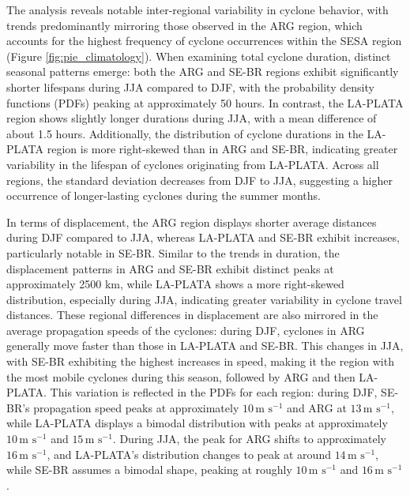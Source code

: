 The analysis reveals notable inter-regional variability in cyclone behavior, with trends predominantly mirroring those observed in the ARG region, which accounts for the highest frequency of cyclone occurrences within the SESA region (Figure \ref{fig:pie_climatology}). When examining total cyclone duration, distinct seasonal patterns emerge: both the ARG and SE-BR regions exhibit significantly shorter lifespans during JJA compared to DJF, with the probability density functions (PDFs) peaking at approximately 50 hours. In contrast, the LA-PLATA region shows slightly longer durations during JJA, with a mean difference of about 1.5 hours. Additionally, the distribution of cyclone durations in the LA-PLATA region is more right-skewed than in ARG and SE-BR, indicating greater variability in the lifespan of cyclones originating from LA-PLATA. Across all regions, the standard deviation decreases from DJF to JJA, suggesting a higher occurrence of longer-lasting cyclones during the summer months.

In terms of displacement, the ARG region displays shorter average distances during DJF compared to JJA, whereas LA-PLATA and SE-BR exhibit increases, particularly notable in SE-BR. Similar to the trends in duration, the displacement patterns in ARG and SE-BR exhibit distinct peaks at approximately 2500 km, while LA-PLATA shows a more right-skewed distribution, especially during JJA, indicating greater variability in cyclone travel distances. These regional differences in displacement are also mirrored in the average propagation speeds of the cyclones: during DJF, cyclones in ARG generally move faster than those in LA-PLATA and SE-BR. This changes in JJA, with SE-BR exhibiting the highest increases in speed, making it the region with the most mobile cyclones during this season, followed by ARG and then LA-PLATA. This variation is reflected in the PDFs for each region: during DJF, SE-BR's propagation speed peaks at approximately \(10 \, \text{m s}^{-1}\) and ARG at \(13 \, \text{m s}^{-1}\), while LA-PLATA displays a bimodal distribution with peaks at approximately \(10 \, \text{m s}^{-1}\) and \(15 \, \text{m s}^{-1}\). During JJA, the peak for ARG shifts to approximately \(16 \, \text{m s}^{-1}\), and LA-PLATA's distribution changes to peak at around \(14 \, \text{m s}^{-1}\), while SE-BR assumes a bimodal shape, peaking at roughly \(10 \, \text{m s}^{-1}\) and \(16 \, \text{m s}^{-1}\).

